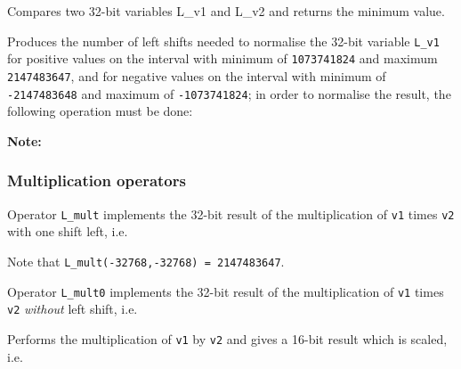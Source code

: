  

Compares two 32-bit variables L\_v1 and L\_v2 and returns the
minimum value.


Produces the number of left shifts needed to normalise the 32-bit
variable {\tt L\_v1} for positive values on the interval with
minimum of {\tt 1073741824} and maximum {\tt 2147483647}, and for
negative values on the interval with minimum of {\tt -2147483648}
and maximum of {\tt -1073741824}; in order to normalise the
result, the following operation must be done:


\textbf{Note:} \hfill {}

\subsubsection{Multiplication operators}


Operator {\tt L\_mult} implements the 32-bit result of the
multiplication of {\tt v1} times {\tt v2} with one shift left,
i.e.


Note that {\tt L\_mult(-32768,-32768) = 2147483647}.


Operator {\tt L\_mult0} implements the 32-bit result of the
multiplication of {\tt v1} times {\tt v2} {\em without} left
shift, i.e.



Performs the multiplication of {\tt v1} by {\tt v2} and gives a 16-bit
result which is scaled, i.e.


